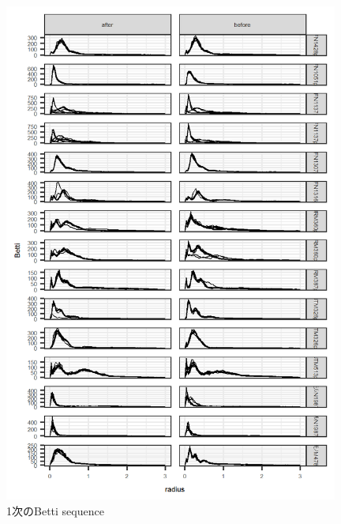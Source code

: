 \documentclass{jarticle}
\begin{document}
\begin{figure}[H]
\begin{center}
	\includegraphics[width=11cm]{fig/betti_1.png}	
	\caption{1次のBetti sequence}\label{fig:betti1}
\end{center}
\end{figure}
\end{document}
